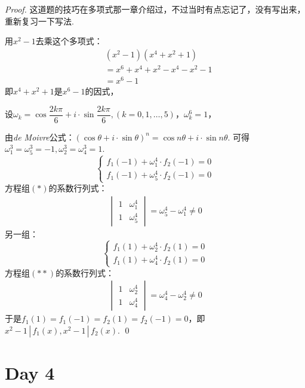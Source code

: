 \begin{proof}
	这道题的技巧在多项式那一章介绍过，不过当时有点忘记了，没有写出来，重新复习一下写法.

	用$x^2-1$去乘这个多项式：
	\begin{align*}
		&(x^2-1)(x^4+x^2+1)  \\
		&=x^6 + x^4 + x^2 - x^4 - x^2 -1\\
		&=x^6-1
	\end{align*}
	即$x^4+x^2+1$是$x^6-1$的因式，

	设$\omega_k = \cos \dfrac{2k \pi}{6} + i \cdot \sin \dfrac{2k \pi}{6},(k=0,1,\dots,5)$，$\omega_k^6=1$，
	
	由\emph{de Moivre}公式：$(\cos \theta + i \cdot \sin \theta)^n = \cos n \theta + i \cdot \sin n\theta$.
	可得$\omega_1^3=\omega_5^3=-1,\omega_2^3=\omega_4^3=1$.
	\begin{equation}
		\begin{cases}
			f_1(-1) + \omega_1^4 \cdot f_2(-1) = 0 \\
			f_1(-1) + \omega_5^4 \cdot f_2(-1) = 0
			\tag{\textasteriskcentered}
		\end{cases}
	\end{equation}
	方程组$(\ast)$的系数行列式：
	\begin{align*}
		\begin{vmatrix}
			1 & \omega_1^4 \\
			1 & \omega_5^4
		\end{vmatrix} = \omega_5^4- \omega_1^4\neq 0
	\end{align*}
	另一组：
	\begin{equation}
		\begin{cases}
			f_1(1) + \omega_2^4 \cdot f_2(1) = 0 \\
			f_1(1) + \omega_4^4 \cdot f_2(1) = 0
			\tag{\textasteriskcentered \textasteriskcentered}
		\end{cases}
	\end{equation}
	方程组$(\ast \ast)$的系数行列式：
	\begin{align*}
		\begin{vmatrix}
			1 & \omega_2^4 \\
			1 & \omega_4^4
		\end{vmatrix} = \omega_4^4- \omega_2^4\neq 0
	\end{align*}
	于是$f_1(1)=f_1(-1)=f_2(1)=f_2(-1)=0$，即$x^2-1 \, | \, f_1(x),x^2-1 \, | \, f_2(x)$.
	\qed{}
\end{proof}

\section*{Day 4}

